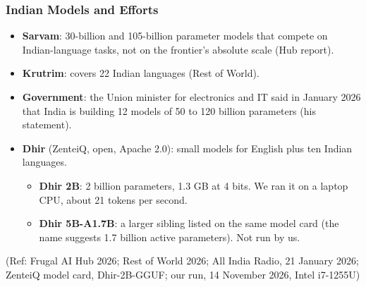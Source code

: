 \begin{frame}[fragile]\frametitle{Indian Models and Efforts}
\begin{itemize}
\item \textbf{Sarvam}: 30-billion and 105-billion parameter models that compete on Indian-language tasks, not on the frontier's absolute scale (Hub report).
\item \textbf{Krutrim}: covers 22 Indian languages (Rest of World).
\item \textbf{Government}: the Union minister for electronics and IT said in January 2026 that India is building 12 models of 50 to 120 billion parameters (his statement).
\item \textbf{Dhir} (ZenteiQ, open, Apache 2.0): small models for English plus ten Indian languages.
	\begin{itemize}
	\item \textbf{Dhir 2B}: 2 billion parameters, 1.3 GB at 4 bits. We ran it on a laptop CPU, about 21 tokens per second.
	\item \textbf{Dhir 5B-A1.7B}: a larger sibling listed on the same model card (the name suggests 1.7 billion active parameters). Not run by us.
	\end{itemize}
\end{itemize}
{\tiny (Ref: Frugal AI Hub 2026; Rest of World 2026; All India Radio, 21 January 2026; ZenteiQ model card, Dhir-2B-GGUF; our run, 14 November 2026, Intel i7-1255U)}
\end{frame}
